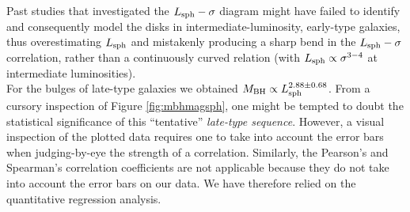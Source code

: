 \documentclass[preprint2]{emulateapj}
\begin{document}
Past studies that investigated the $L_{\rm sph} - \sigma$ diagram might have failed to identify and consequently model the disks 
in intermediate-luminosity, early-type galaxies, thus overestimating $L_{\rm sph}$ 
and mistakenly producing a sharp bend in the $L_{\rm sph} - \sigma$ correlation, rather than a continuously curved relation 
(with $L_{\rm sph} \propto \sigma^{3-4}$ at intermediate luminosities). \\
For the bulges of late-type galaxies we obtained $M_{\rm BH} \propto L_{\rm sph}^{2.88 \pm 0.68}$. 
From a cursory inspection of Figure \ref{fig:mbhmagsph}, one might be tempted to doubt the statistical significance of this ``tentative'' \emph{late-type sequence}. 
However, a visual inspection of the plotted data requires one to take into account the error bars 
when judging-by-eye the strength of a correlation. 
Similarly, the Pearson's and Spearman's correlation coefficients are not applicable because 
they do not take into account the error bars on our data.
We have therefore relied on the quantitative regression analysis.
\end{document}

